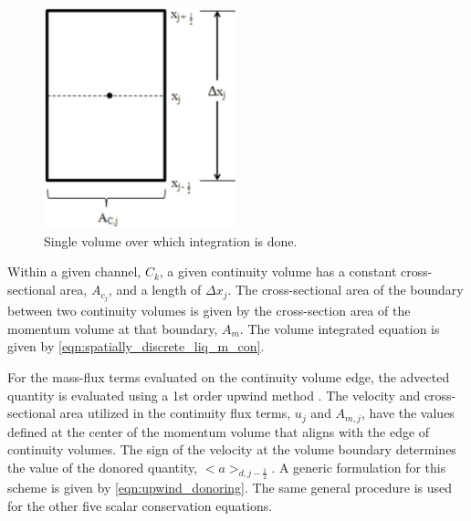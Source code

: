 \begin{figure}[h!t]
\begin{center}
\includegraphics[width=0.5\textwidth]{images/single_volume.eps}
\end{center}
\caption{Single volume over which integration is done.}
\label{fig:single_volume}
\end{figure}

Within a given channel, $C_k$, a given continuity volume has a constant cross-sectional area, $A_{c_{j}}$, and a length of $\Delta x_{j}$.
The cross-sectional area of the boundary between two continuity volumes is given by the cross-section area of the momentum volume at that boundary, $A_{m}$.
The volume integrated equation is given by \eqref{eqn:spatially_discrete_liq_m_con}.

For the mass-flux terms evaluated on the continuity volume edge, the advected quantity is evaluated using a 1st order upwind method \cite{Tannehill1997}.
The velocity and cross-sectional area utilized in the continuity flux terms, $u_j$ and $A_{m,j}$, have the values defined at the center of the momentum volume that aligns with the edge of continuity volumes.
The sign of the velocity at the volume boundary determines the value of the donored quantity, $<a>_{d,j-\frac{1}{2}}$.
A generic formulation for this scheme is given by \eqref{eqn:upwind_donoring}.
The same general procedure is used for the other five scalar conservation equations.

